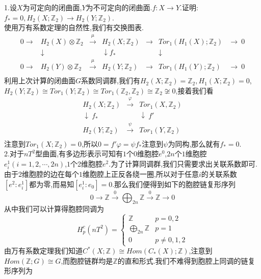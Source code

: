 \documentclass[b5paper]{ctexart}
\begin{document}
\pagestyle{plain}
\noindent
{}
1.设$X$为可定向的闭曲面,$Y$为不可定向的闭曲面.$f:X\rightarrow Y$.证明:$f_*=0,H_2(X;\mathbb{Z}_2)\rightarrow H_2(Y;\mathbb{Z}_2)$.\\
使用万有系数定理的自然性,我们有交换图表.\\
\[\begin{array}{ccccccc}
0  \rightarrow & H_2(X)\otimes \mathbb{Z}_2& \xrightarrow{\mu}& H_2(X;\mathbb{Z}_2)& \rightarrow & Tor_1(H_1(X);\mathbb{Z}_2)&\rightarrow ~0\\
               &\downarrow          &                  &\downarrow f_*&             &\downarrow       \\
0  \rightarrow & H_2(Y)\otimes \mathbb{Z}_2& \xrightarrow{\mu}& H_2(Y;\mathbb{Z}_2)& \rightarrow & Tor_1(H_1(Y);\mathbb{Z}_2)&\rightarrow ~0\\
\end{array}
\]
利用上次计算的闭曲面$G$系数同调群,我们有$H_2(X;\mathbb{Z}_2)=\mathbb{Z}_2,H_1(X;\mathbb{Z}_2)=0$,\\
$H_2(Y;\mathbb{Z}_2)\cong
Tor_1(Y;\mathbb{Z}_2)\cong
Tor_1(\mathbb{Z}_2,\mathbb{Z}_2)\cong \mathbb{Z}_2\not\cong 0$,接着我们看
\[\begin{array}{ccc}
H_2(X;\mathbb{Z}_2)&\xrightarrow{\varphi} & Tor_1(X,\mathbb{Z}_2)\\
\downarrow~f_*& &\downarrow~f'\\
H_2(Y;\mathbb{Z}_2)&\xrightarrow{\psi} & Tor_1(Y,\mathbb{Z}_2)\\
\end{array}
\]
注意到$Tor_1(X;\mathbb{Z}_2)=0$,所以$0=f'\varphi=\psi f_*$注意到$\psi$为同构,那么就有$f_*=0$.\\
2.对于$nT^2$型曲面,有多边形表示可知有$1$个$0$维胞腔$e^0$,$2n$个$1$维胞腔$e^1_i(i=1,2,\cdots,2n)$,$1$个2维胞腔$e^2$.为了计算同调群,我们只需要求出关联系数即可.
由于$2$维胞腔的边在每个$1$维胞腔上正反各绕一圈,所以对于任意$i$的关联系数$[e^2:e^1_i]$都为零,而易知$[e^1_i:e_0]=0$.那么我们便得到如下的胞腔链复形序列
\[0\rightarrow \mathbb{Z}\xrightarrow{0} \bigoplus_{2n}\mathbb{Z}\xrightarrow{0}\mathbb{Z}\rightarrow 0\]
从中我们可以计算得胞腔同调为
\[H_p^c(nT^2)=\left\lbrace \begin{array}{ll}
\mathbb{Z} & p=0,2\\
\bigoplus\limits_{2n}\mathbb{Z} & p=1\\
0 & p\neq 0,1,2
\end{array}\right. \]
由万有系数定理我们知道$C^*(X;\mathbb{Z})\cong Hom(C_*(X);\mathbb{Z})$,注意到$Hom(\mathbb{Z};G)\cong G$,而胞腔链群均是$\mathbb{Z}$的直和形式.我们不难得到胞腔上同调的链复形序列为\\
\end{document}
